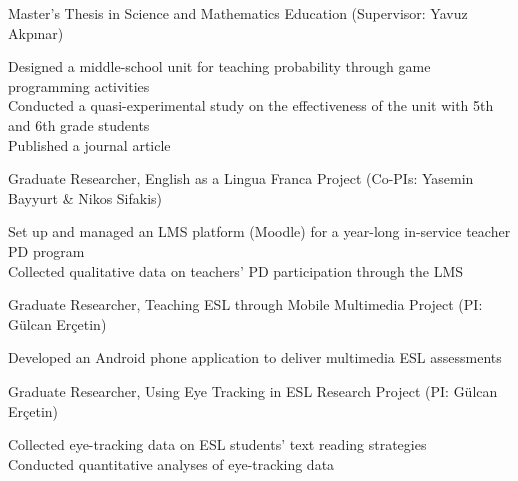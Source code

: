 \documentclass[11pt,letterpaper]{report} %
\newcommand{\indentedsmall}[1]{\hspace{2pt}\small{#1}\normalsize}
\begin{document}
    \begin{tablist}

        \item[2012--14] \tab{}Master's Thesis in Science and Mathematics Education (Supervisor: Yavuz Akpınar) \\

        \vspace{4pt}

        \indentedsmall{Designed a middle-school unit for teaching probability through game programming activities} \\
        \indentedsmall{Conducted a quasi-experimental study on the effectiveness of the unit with 5th and 6th grade students} \\
        \indentedsmall{Published a journal article}

        \vspace{6pt}

        \item[2012--14] \tab{}Graduate Researcher, English as a Lingua Franca Project (Co-PIs: Yasemin Bayyurt \& Nikos Sifakis) \\

        \vspace{4pt}

        \indentedsmall{Set up and managed an LMS platform (Moodle) for a year-long in-service teacher PD program} \\
        \indentedsmall{Collected qualitative data on teachers' PD participation through the LMS}

        \vspace{6pt}

        \item[2012--14] \tab{}Graduate Researcher, Teaching ESL through Mobile Multimedia Project (PI: Gülcan Erçetin) \\

        \vspace{4pt}

        \indentedsmall{Developed an Android phone application to deliver multimedia ESL assessments} \\

        \vspace{6pt}

        \item[2010--12] \tab{}Graduate Researcher, Using Eye Tracking in ESL Research Project (PI: Gülcan Erçetin) \\

        \vspace{4pt}

        \indentedsmall{Collected eye-tracking data on ESL students' text reading strategies} \\
        \indentedsmall{Conducted quantitative analyses of eye-tracking data} \\

    \end{tablist}
\end{document}
